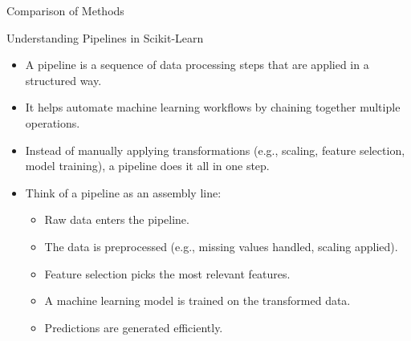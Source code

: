 \documentclass[11pt]{beamer}
\begin{document}
%
%
\begin{frame}{Comparison of Methods}
\end{frame}
%
%
\begin{frame}{Understanding Pipelines in Scikit-Learn}
    \begin{itemize}
        \item A pipeline is a sequence of data processing steps that are applied in a structured way.
        \item It helps automate machine learning workflows by chaining together multiple operations.
        \item Instead of manually applying transformations (e.g., scaling, feature selection, model training), a pipeline does it all in one step.
        \item Think of a pipeline as an assembly line: 
        \begin{itemize}
            \item Raw data enters the pipeline.
            \item The data is preprocessed (e.g., missing values handled, scaling applied).
            \item Feature selection picks the most relevant features.
            \item A machine learning model is trained on the transformed data.
            \item Predictions are generated efficiently.
        \end{itemize}
    \end{itemize}
\end{frame}
%
%
\end{document}
